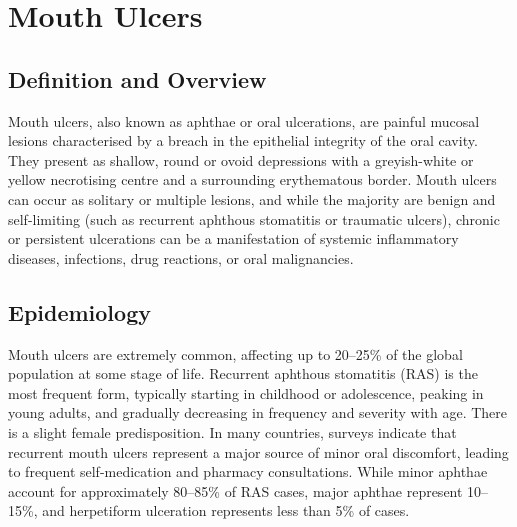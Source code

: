 \chapter{Mouth Ulcers}

\section*{Definition and Overview}
Mouth ulcers, also known as aphthae or oral ulcerations, are painful mucosal lesions characterised by a breach in the epithelial integrity of the oral cavity. They present as shallow, round or ovoid depressions with a greyish-white or yellow necrotising centre and a surrounding erythematous border. Mouth ulcers can occur as solitary or multiple lesions, and while the majority are benign and self-limiting (such as recurrent aphthous stomatitis or traumatic ulcers), chronic or persistent ulcerations can be a manifestation of systemic inflammatory diseases, infections, drug reactions, or oral malignancies.

\section*{Epidemiology}
Mouth ulcers are extremely common, affecting up to 20--25\% of the global population at some stage of life. Recurrent aphthous stomatitis (RAS) is the most frequent form, typically starting in childhood or adolescence, peaking in young adults, and gradually decreasing in frequency and severity with age. There is a slight female predisposition. In many countries, surveys indicate that recurrent mouth ulcers represent a major source of minor oral discomfort, leading to frequent self-medication and pharmacy consultations. While minor aphthae account for approximately 80--85\% of RAS cases, major aphthae represent 10--15\%, and herpetiform ulceration represents less than 5\% of cases.

